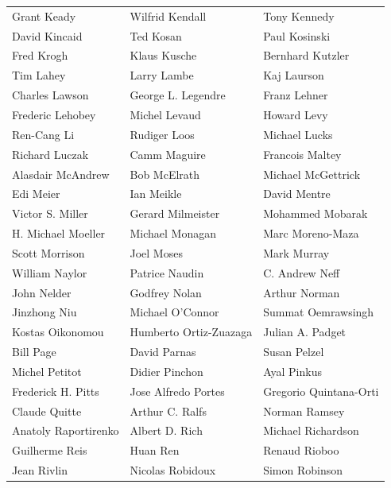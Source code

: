 \begin{tabular}{lll}
Grant Keady            & Wilfrid Kendall        & Tony Kennedy\\
David Kincaid          & Ted Kosan              & Paul Kosinski\\
Fred Krogh             & Klaus Kusche           & Bernhard Kutzler\\
Tim Lahey              & Larry Lambe            & Kaj Laurson\\
Charles Lawson         & George L. Legendre     & Franz Lehner\\
Frederic Lehobey       & Michel Levaud          & Howard Levy\\
Ren-Cang Li            & Rudiger Loos           & Michael Lucks\\
Richard Luczak         & Camm Maguire           & Francois Maltey\\
Alasdair McAndrew      & Bob McElrath           & Michael McGettrick\\
Edi Meier              & Ian Meikle             & David Mentre\\
Victor S. Miller       & Gerard Milmeister      & Mohammed Mobarak\\
H. Michael Moeller     & Michael Monagan        & Marc Moreno-Maza\\
Scott Morrison         & Joel Moses             & Mark Murray\\
William Naylor         & Patrice Naudin         & C. Andrew Neff\\
John Nelder            & Godfrey Nolan          & Arthur Norman\\
Jinzhong Niu           & Michael O'Connor       & Summat Oemrawsingh\\
Kostas Oikonomou       & Humberto Ortiz-Zuazaga & Julian A. Padget\\
Bill Page              & David Parnas           & Susan Pelzel\\
Michel Petitot         & Didier Pinchon         & Ayal Pinkus\\
Frederick H. Pitts     & Jose Alfredo Portes    & Gregorio Quintana-Orti\\
Claude Quitte          & Arthur C. Ralfs        & Norman Ramsey\\
Anatoly Raportirenko   & Albert D. Rich         & Michael Richardson\\
Guilherme Reis         & Huan Ren               & Renaud Rioboo\\
Jean Rivlin            & Nicolas Robidoux       & Simon Robinson\\

\end{tabular}
